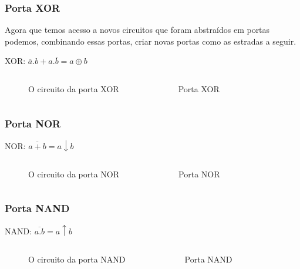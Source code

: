 \begin{frame}
	\frametitle{Porta XOR}
	\par Agora que temos acesso a novos circuitos que foram abstraídos em portas podemos, combinando essas portas, criar novas portas como as estradas a seguir.
	\par XOR: $\boxed{\overline{a}.b+a.\overline{b} = a \oplus b}$
	\begin{columns}
			\begin{figure}
				\centering
				
				\caption{O circuito da porta XOR}
				\label{fig:cicuitoxor}
			\end{figure}
			\begin{figure}
				\centering
				
				\caption{Porta XOR}
				\label{fig:cicuitoxorabstrato}
			\end{figure}
	\end{columns}
\end{frame}

\begin{frame}
	\frametitle{Porta NOR}
	\par NOR: $\boxed{\overline{a+b} = a \downarrow b}$
	\begin{columns}
		\column{0.5\textwidth}
		\begin{figure}
			\centering
			
			\caption{O circuito da porta NOR}
			\label{fig:cicuitonor}
		\end{figure}
		\column{0.5\textwidth}
		\begin{figure}
			\centering
			
			\caption{Porta NOR}
			\label{fig:cicuitonorabstrato}
		\end{figure}
	\end{columns}
\end{frame}

\begin{frame}
	\frametitle{Porta NAND}
	\par NAND: $\boxed{\overline{a.b} = a \uparrow b}$
	\begin{columns}
		\begin{figure}
			\centering
			
			\caption{O circuito da porta NAND}
			\label{fig:cicuitonand}
		\end{figure}
		\begin{figure}
			\centering
			
			\caption{Porta NAND}
			\label{fig:cicuitonandabstrato}
		\end{figure}
	\end{columns}
\end{frame}


